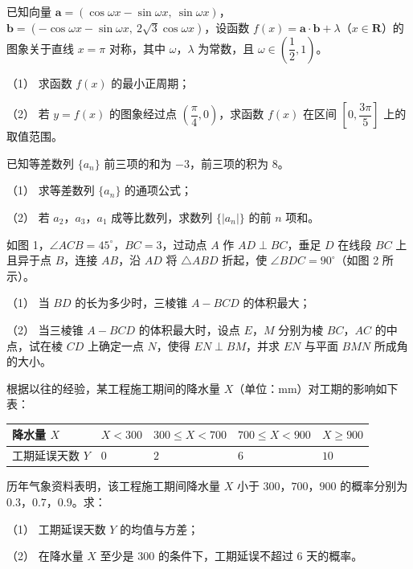 \begin{question}
已知向量 $\boldsymbol a=(\cos\omega x-\sin\omega x,\ \sin\omega x)$，$\boldsymbol b=(-\cos\omega x-\sin\omega x,\ 2\sqrt3\cos\omega x)$，设函数 $f(x)=\boldsymbol a\cdot\boldsymbol b+\lambda$（$x\in\mathbf R$）的图象关于直线 $x=\pi$ 对称，其中 $\omega$，$\lambda$ 为常数，且 $\omega\in\left(\dfrac12,1\right)$。

（1） 求函数 $f(x)$ 的最小正周期；

（2） 若 $y=f(x)$ 的图象经过点 $\left(\dfrac{\pi}{4},0\right)$，求函数 $f(x)$ 在区间 $\left[0,\dfrac{3\pi}{5}\right]$ 上的取值范围。

\end{question}
\begin{question}
已知等差数列 $\{a_n\}$ 前三项的和为 $-3$，前三项的积为 $8$。

（1） 求等差数列 $\{a_n\}$ 的通项公式；

（2） 若 $a_2$，$a_3$，$a_1$ 成等比数列，求数列 $\{|a_n|\}$ 的前 $n$ 项和。

\Needspace{0.4\textheight}
\end{question}
\begin{question}
如图 1，$\angle ACB=45^\circ$，$BC=3$，过动点 $A$ 作 $AD\perp BC$，垂足 $D$ 在线段 $BC$ 上且异于点 $B$，连接 $AB$，沿 $AD$ 将 $\triangle ABD$ 折起，使 $\angle BDC=90^\circ$（如图 2 所示）。

（1） 当 $BD$ 的长为多少时，三棱锥 $A-BCD$ 的体积最大；

（2） 当三棱锥 $A-BCD$ 的体积最大时，设点 $E$，$M$ 分别为棱 $BC$，$AC$ 的中点，试在棱 $CD$ 上确定一点 $N$，使得 $EN\perp BM$，并求 $EN$ 与平面 $BMN$ 所成角的大小。
\nopagebreak[4]
\begin{center}\end{center}
\nopagebreak[4]
\nopagebreak[4]
\begin{center}\end{center}
\nopagebreak[4]
\end{question}
\begin{question}
根据以往的经验，某工程施工期间的降水量 $X$（单位：mm）对工期的影响如下表：

\begin{center}
\begin{tabular}{lllll}
\toprule
降水量 $X$ & $X<300$ & $300\leqslant X<700$ & $700\leqslant X<900$ & $X\geqslant900$ \\
\midrule
工期延误天数 $Y$ & $0$ & $2$ & $6$ & $10$ \\
\bottomrule
\end{tabular}
\end{center}

历年气象资料表明，该工程施工期间降水量 $X$ 小于 $300$，$700$，$900$ 的概率分别为 $0.3$，$0.7$，$0.9$。求：

（1） 工期延误天数 $Y$ 的均值与方差；

（2） 在降水量 $X$ 至少是 $300$ 的条件下，工期延误不超过 $6$ 天的概率。

\end{question}
